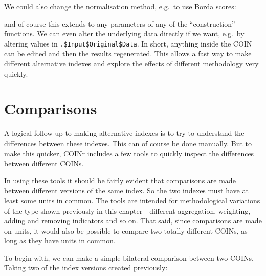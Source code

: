 \documentclass[
]{book}
\newenvironment{Shaded}{\begin{snugshade}}{\end{snugshade}}
\newcommand{\CommentTok}[1]{\textcolor[rgb]{0.56,0.35,0.01}{\textit{#1}}}
\newcommand{\DataTypeTok}[1]{\textcolor[rgb]{0.13,0.29,0.53}{#1}}
\newcommand{\KeywordTok}[1]{\textcolor[rgb]{0.13,0.29,0.53}{\textbf{#1}}}
\newcommand{\NormalTok}[1]{#1}
\newcommand{\OperatorTok}[1]{\textcolor[rgb]{0.81,0.36,0.00}{\textbf{#1}}}
\newcommand{\OtherTok}[1]{\textcolor[rgb]{0.56,0.35,0.01}{#1}}
\newcommand{\StringTok}[1]{\textcolor[rgb]{0.31,0.60,0.02}{#1}}
\begin{document}
We could also change the normalisation method, e.g.~to use Borda scores:

\begin{Shaded}
\end{Shaded}

and of course this extends to any parameters of any of the ``construction'' functions. We can even alter the underlying data directly if we want, e.g.~by altering values in \texttt{.\$Input\$Original\$Data}. In short, anything inside the COIN can be edited and then the results regenerated. This allows a fast way to make different alternative indexes and explore the effects of different methodology very quickly.

\hypertarget{comparisons}{%
\section{Comparisons}\label{comparisons}}

A logical follow up to making alternative indexes is to try to understand the differences between these indexes. This can of course be done manually. But to make this quicker, COINr includes a few tools to quickly inspect the differences between different COINs.

In using these tools it should be fairly evident that comparisons are made between different versions of the same index. So the two indexes must have at least some units in common. The tools are intended for methodological variations of the type shown previously in this chapter - different aggregation, weighting, adding and removing indicators and so on. That said, since comparisons are made on units, it would also be possible to compare two totally different COINs, as long as they have units in common.

To begin with, we can make a simple bilateral comparison between two COINs. Taking two of the index versions created previously:
\end{document}

